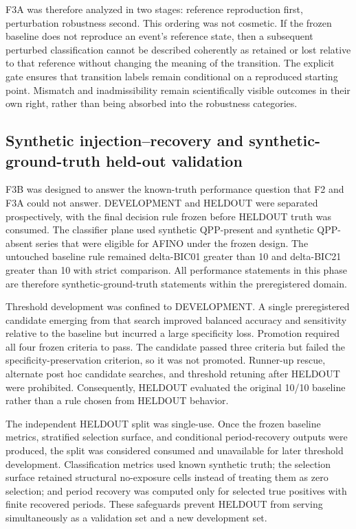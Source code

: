\documentclass[11pt,a4paper]{article}
\begin{document}
F3A was therefore analyzed in two stages: reference reproduction first, perturbation robustness second. This ordering was not cosmetic. If the frozen baseline does not reproduce an event's reference state, then a subsequent perturbed classification cannot be described coherently as retained or lost relative to that reference without changing the meaning of the transition. The explicit gate ensures that transition labels remain conditional on a reproduced starting point. Mismatch and inadmissibility remain scientifically visible outcomes in their own right, rather than being absorbed into the robustness categories.

\subsection{Synthetic injection--recovery and synthetic-ground-truth held-out validation}
F3B was designed to answer the known-truth performance question that F2 and F3A could not answer. DEVELOPMENT and HELDOUT were separated prospectively, with the final decision rule frozen before HELDOUT truth was consumed. The classifier plane used synthetic QPP-present and synthetic QPP-absent series that were eligible for AFINO under the frozen design. The untouched baseline rule remained delta-BIC01 greater than 10 and delta-BIC21 greater than 10 with strict comparison. All performance statements in this phase are therefore synthetic-ground-truth statements within the preregistered domain.

Threshold development was confined to DEVELOPMENT. A single preregistered candidate emerging from that search improved balanced accuracy and sensitivity relative to the baseline but incurred a large specificity loss. Promotion required all four frozen criteria to pass. The candidate passed three criteria but failed the specificity-preservation criterion, so it was not promoted. Runner-up rescue, alternate post hoc candidate searches, and threshold retuning after HELDOUT were prohibited. Consequently, HELDOUT evaluated the original 10/10 baseline rather than a rule chosen from HELDOUT behavior.

The independent HELDOUT split was single-use. Once the frozen baseline metrics, stratified selection surface, and conditional period-recovery outputs were produced, the split was considered consumed and unavailable for later threshold development. Classification metrics used known synthetic truth; the selection surface retained structural no-exposure cells instead of treating them as zero selection; and period recovery was computed only for selected true positives with finite recovered periods. These safeguards prevent HELDOUT from serving simultaneously as a validation set and a new development set.
\end{document}
